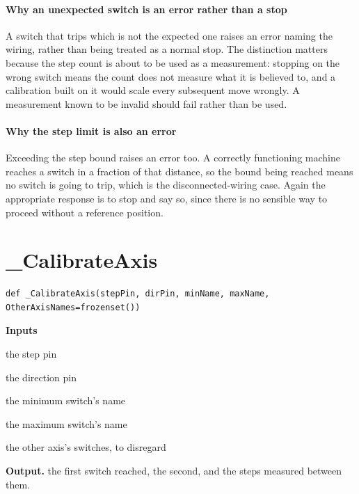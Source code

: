 \paragraph{Why an unexpected switch is an error rather than a stop}
A switch that trips which is not the expected one raises an error naming the wiring, rather than being treated as a normal stop. The distinction matters because the step count is about to be used as a measurement: stopping on the wrong switch means the count does not measure what it is believed to, and a calibration built on it would scale every subsequent move wrongly. A measurement known to be invalid should fail rather than be used.


\paragraph{Why the step limit is also an error}
Exceeding the step bound raises an error too. A correctly functioning machine reaches a switch in a fraction of that distance, so the bound being reached means no switch is going to trip, which is the disconnected-wiring case. Again the appropriate response is to stop and say so, since there is no sensible way to proceed without a reference position.


\section{\_CalibrateAxis}
\begin{lstlisting}[style=sig]
def _CalibrateAxis(stepPin, dirPin, minName, maxName, OtherAxisNames=frozenset())
\end{lstlisting}

\noindent\textbf{Inputs}
\begin{description}[leftmargin=2.2em,style=nextline,font=\normalfont\ttfamily]\setlength\itemsep{1pt}
  \item[{stepPin}] \normalfont the step pin
  \item[{dirPin}] \normalfont the direction pin
  \item[{minName}] \normalfont the minimum switch's name
  \item[{maxName}] \normalfont the maximum switch's name
  \item[{OtherAxisNames}] \normalfont the other axis's switches, to disregard
\end{description}

\noindent\textbf{Output.} the first switch reached, the second, and the steps measured between them.


